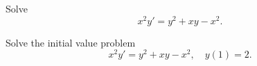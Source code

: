 \begin{example}
  \label{example:2.4.3}\rm \mbox{}
  \newline
  \begin{alist}
    \item %
    Solve
    \begin{equation}
      \label{eq:2.4.9}x^{2}y'=y^{2}+xy-x^{2}.
    \end{equation}

    \item %
    Solve the initial value problem
    \begin{equation}
      \label{eq:2.4.10}x^{2}y'=y^{2}+xy-x^{2},\quad y(1)=2.
    \end{equation}
  \end{alist}
\end{example}

